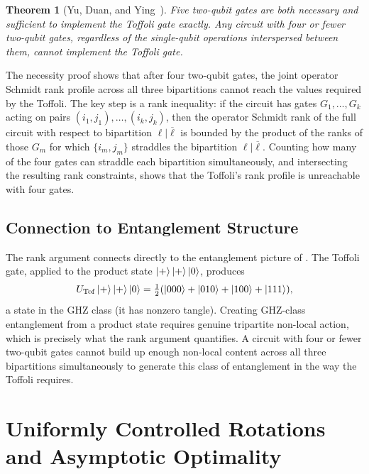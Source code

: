 \documentclass[12pt, a4paper, oneside]{report}
\theoremstyle{plain}
\newtheorem{theorem}{Theorem}[chapter]
\theoremstyle{definition}
\theoremstyle{remark}
\begin{document}
\begin{theorem}[Yu, Duan, and Ying~\cite{yu2013}]
\label{thm:yu-duan-ying}
Five two-qubit gates are both necessary and sufficient to implement the Toffoli gate exactly.
Any circuit with four or fewer two-qubit gates, regardless of the single-qubit operations
interspersed between them, cannot implement the Toffoli gate.
\end{theorem}

The necessity proof shows that after four two-qubit gates, the joint operator Schmidt rank
profile across all three bipartitions cannot reach the values required by the Toffoli. The
key step is a rank inequality: if the circuit has gates $G_1, \ldots, G_k$ acting on pairs
$(i_1, j_1), \ldots, (i_k, j_k)$, then the operator Schmidt rank of the full circuit with
respect to bipartition $\ell | \overline{\ell}$ is bounded by the product of the ranks of
those $G_m$ for which $\{i_m, j_m\}$ straddles the bipartition $\ell | \overline{\ell}$.
Counting how many of the four gates can straddle each bipartition simultaneously, and
intersecting the resulting rank constraints, shows that the Toffoli's rank profile is
unreachable with four gates.

\subsection{Connection to Entanglement Structure}

The rank argument connects directly to the entanglement picture of
. The Toffoli gate, applied to the product state
$\ket{+}\ket{+}\ket{0}$, produces
\[
  U_{\mathrm{Tof}}\ket{+}\ket{+}\ket{0}
  = \tfrac{1}{2}(\ket{000}+\ket{010}+\ket{100}+\ket{111}),
\]
a state in the GHZ class (it has nonzero tangle). Creating GHZ-class entanglement from a
product state requires genuine tripartite non-local action, which is precisely what the rank
argument quantifies. A circuit with four or fewer two-qubit gates cannot build up enough
non-local content across all three bipartitions simultaneously to generate this class of
entanglement in the way the Toffoli requires.


\section{Uniformly Controlled Rotations and Asymptotic Optimality}
\label{sec:ucr}
\end{document}
